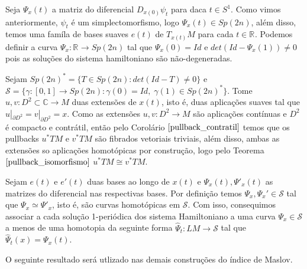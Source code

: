 \documentclass[12pt]{book}
\newcommand{\real}[1]{\mathbb{R}^{#1}}
\newcommand{\vermelho}[1]{{\color{red}#1}}
\begin{document}
	Seja $\Psi_{x}(t)$ a matriz do diferencial $D_{x(0)}\psi_{t}$ para daca $t\in S^{1}$. Como vimos anteriormente, $\psi_{t}$ é um simplectomorfismo, logo $\Psi_{x}(t) \in Sp(2n)$, além disso, temos uma famíla de bases suaves $e(t)$ de $T_{x(t)}M$ para cada $t \in \real{}$. Podemos definir a curva $\Psi_{x}:\real{} \to Sp(2n)$ tal que $\Psi_{x}(0) = Id$ e $det(Id-\Psi_{x}(1)) \neq 0$ pois as soluções do sistema hamiltoniano são não-degeneradas.
	
	Sejam $Sp(2n)^{*} = \{T\in Sp(2n): det(Id-T) \neq 0\}$ e $\mathcal{S} = \{\gamma:[0,1] \to Sp(2n): \gamma(0) = Id,\; \gamma(1)\in Sp(2n)^{*} \}$. Tome $u,v : D^{2} \subset \mathbb{C} \to M$ duas extensões de $x(t)$, isto é, duas aplicações suaves tal que $u|_{\partial D^{2}} = v|_{\partial D^{2}} = x$. Como as extensões $u,v:D^{2} \to M$ são aplicações contínuas e $D^{2}$ é compacto e contrátil, então pelo Corolário $\ref{pullback_contratil}$ temos que os pullbacks $u^{*}TM$ e $v^{*}TM$ são fibrados vetoriais triviais, além disso, ambas as extensões so aplicações homotópicas por construção, logo pelo Teorema $\ref{pullback_isomorfismo}$  $u^{*}TM \cong v^{*}TM$.
	
	Sejam $e(t)$ e $e'(t)$ duas bases ao longo de $x(t)$ e $\Psi_{x}(t), \Psi'_{x}(t)$ as matrizes do diferencial nas respectivas bases. Por definição temos $\Psi_{x}, \Psi_{x}' \in \mathcal{S}$ tal que $\Psi_{x} \simeq \Psi'_{x}$, isto é, \vermelho{são curvas homotópicas em $\mathcal{S}$}. Com isso, consequimos associar a cada solução 1-periódica dos sistema Hamiltoniano a uma curva $\Psi_{x} \in \mathcal{S}$ a menos de uma homotopia da seguinte forma $\hat{\Psi}_{t}:LM \to \mathcal{S}$ tal que $\hat{\Psi}_{t}(x) = \Psi_{x}(t)$.
	
	O seguinte resultado será utlizado nas demais construções do índice de Maslov.
	
\end{document}
